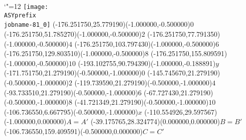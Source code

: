 \setlength{\unitlength}{1pt}%
\makeatletter%
\let\ASYencoding\f@encoding%
\let\ASYfamily\f@family%
\let\ASYseries\f@series%
\let\ASYshape\f@shape%
\makeatother%
{\catcode`"=12%
\texttt{[image: \\ASYprefix\\jobname-81\_0]}%
}%
\color{ASYcolor}%
\fontsize{12.000000}{14.400000}\selectfont%
\usefont{\ASYencoding}{\ASYfamily}{\ASYseries}{\ASYshape}%
\ASYalign(-176.251750,25.779190)(-1.000000,-0.500000){\vphantom{$10^4$}$0$}%
\color{ASYcolor}%
\fontsize{12.000000}{14.400000}\selectfont%
\ASYalign(-176.251750,51.785270)(-1.000000,-0.500000){\vphantom{$10^4$}$2$}%
\color{ASYcolor}%
\fontsize{12.000000}{14.400000}\selectfont%
\ASYalign(-176.251750,77.791350)(-1.000000,-0.500000){\vphantom{$10^4$}$4$}%
\color{ASYcolor}%
\fontsize{12.000000}{14.400000}\selectfont%
\ASYalign(-176.251750,103.797430)(-1.000000,-0.500000){\vphantom{$10^4$}$6$}%
\color{ASYcolor}%
\fontsize{12.000000}{14.400000}\selectfont%
\ASYalign(-176.251750,129.803510)(-1.000000,-0.500000){\vphantom{$10^4$}$8$}%
\color{ASYcolor}%
\fontsize{12.000000}{14.400000}\selectfont%
\ASYalign(-176.251750,155.809591)(-1.000000,-0.500000){\vphantom{$10^4$}$10$}%
\color{ASYcolor}%
\fontsize{12.000000}{14.400000}\selectfont%
\ASYalign(-193.102755,90.794390)(-1.000000,-0.188891){$y$}%
\color{ASYcolor}%
\fontsize{12.000000}{14.400000}\selectfont%
\ASYalign(-171.751750,21.279190)(-0.500000,-1.000000){\vphantom{$10^4$}$0$}%
\color{ASYcolor}%
\fontsize{12.000000}{14.400000}\selectfont%
\ASYalign(-145.745670,21.279190)(-0.500000,-1.000000){\vphantom{$10^4$}$2$}%
\color{ASYcolor}%
\fontsize{12.000000}{14.400000}\selectfont%
\ASYalign(-119.739590,21.279190)(-0.500000,-1.000000){\vphantom{$10^4$}$4$}%
\color{ASYcolor}%
\fontsize{12.000000}{14.400000}\selectfont%
\ASYalign(-93.733510,21.279190)(-0.500000,-1.000000){\vphantom{$10^4$}$6$}%
\color{ASYcolor}%
\fontsize{12.000000}{14.400000}\selectfont%
\ASYalign(-67.727430,21.279190)(-0.500000,-1.000000){\vphantom{$10^4$}$8$}%
\color{ASYcolor}%
\fontsize{12.000000}{14.400000}\selectfont%
\ASYalign(-41.721349,21.279190)(-0.500000,-1.000000){\vphantom{$10^4$}$10$}%
\color{ASYcolor}%
\fontsize{12.000000}{14.400000}\selectfont%
\ASYalign(-106.736550,6.667795)(-0.500000,-1.000000){$x$}%
\color{ASYcolor}%
\fontsize{12.000000}{14.400000}\selectfont%
\ASYalign(-110.554926,29.597567)(-1.000000,0.000000){$A=A'$}%
\color{ASYcolor}%
\fontsize{12.000000}{14.400000}\selectfont%
\ASYalign(-39.175765,28.324774)(0.000000,0.000000){$B=B'$}%
\color{ASYcolor}%
\fontsize{12.000000}{14.400000}\selectfont%
\ASYalign(-106.736550,159.409591)(-0.500000,0.000000){$C=C'$}%
